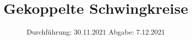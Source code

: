 

\subject{V355}
\title{Gekoppelte Schwingkreise}
\date{
  Durchführung: 30.11.2021
  \hspace{3em}
  Abgabe: 7.12.2021
}



\maketitle
\thispagestyle{empty}
\tableofcontents
\newpage







\printbibliography{}


